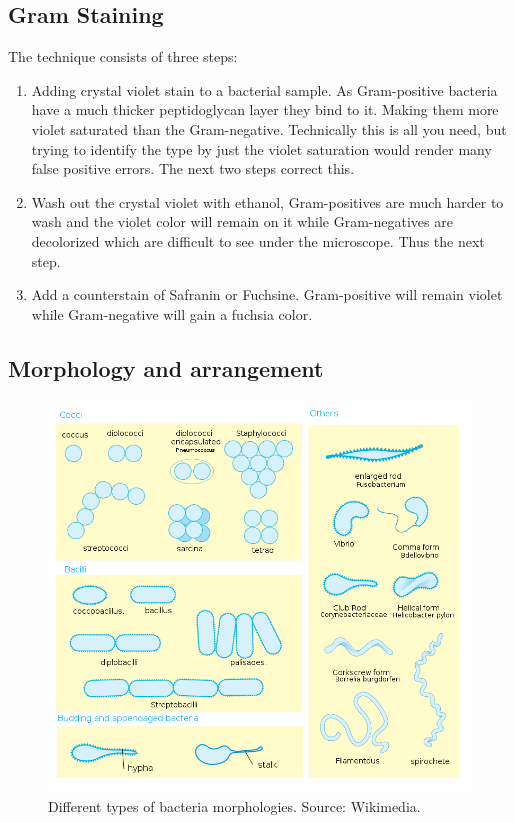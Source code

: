 \subsection{Gram Staining}

The technique consists of three steps:

    \begin{enumerate}
    
        \item Adding crystal violet stain to a bacterial sample. As Gram-positive bacteria have a much thicker peptidoglycan layer they bind to it. Making them more violet saturated than the Gram-negative. Technically this is all you need, but trying to identify the type by just the violet saturation would render many false positive errors. The next two steps correct this.

        \item Wash out the crystal violet with ethanol, Gram-positives are much harder to wash and the violet color will remain on it while Gram-negatives are decolorized which are difficult to see under the microscope. Thus the next step.

        \item Add a counterstain of Safranin or Fuchsine. Gram-positive will remain violet while Gram-negative will gain a fuchsia color.

    \end{enumerate}

\subsection{Morphology and arrangement}

    \begin{figure}[ht]
        \centering
            \includegraphics[width=0.7\linewidth]{figures/Staph/Bacterial_morphology_diagram.svg.png} 
        \caption{Different types of bacteria morphologies. Source: Wikimedia.}
        \label{figure:bacteriashapes}
    \end{figure}

